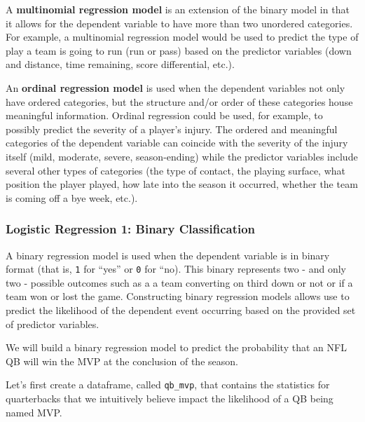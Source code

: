 \documentclass[
  letterpaper,
]{krantz}
\begin{document}
A \textbf{multinomial regression model} is an extension of the binary
model in that it allows for the dependent variable to have more than two
unordered categories. For example, a multinomial regression model would
be used to predict the type of play a team is going to run (run or pass)
based on the predictor variables (down and distance, time remaining,
score differential, etc.).

An \textbf{ordinal regression model} is used when the dependent
variables not only have ordered categories, but the structure and/or
order of these categories house meaningful information. Ordinal
regression could be used, for example, to possibly predict the severity
of a player's injury. The ordered and meaningful categories of the
dependent variable can coincide with the severity of the injury itself
(mild, moderate, severe, season-ending) while the predictor variables
include several other types of categories (the type of contact, the
playing surface, what position the player played, how late into the
season it occurred, whether the team is coming off a bye week, etc.).

\hypertarget{logistic-regression-1-binary-classification}{%
\subsubsection{Logistic Regression 1: Binary
Classification}\label{logistic-regression-1-binary-classification}}

A binary regression model is used when the dependent variable is in
binary format (that is, \texttt{1} for ``yes'' or \texttt{0} for ``no).
This binary represents two - and only two - possible outcomes such as a
a team converting on third down or not or if a team won or lost the
game. Constructing binary regression models allows use to predict the
likelihood of the dependent event occurring based on the provided set of
predictor variables.

We will build a binary regression model to predict the probability that
an NFL QB will win the MVP at the conclusion of the season.

Let's first create a dataframe, called \texttt{qb\_mvp}, that contains
the statistics for quarterbacks that we intuitively believe impact the
likelihood of a QB being named MVP.
\end{document}
